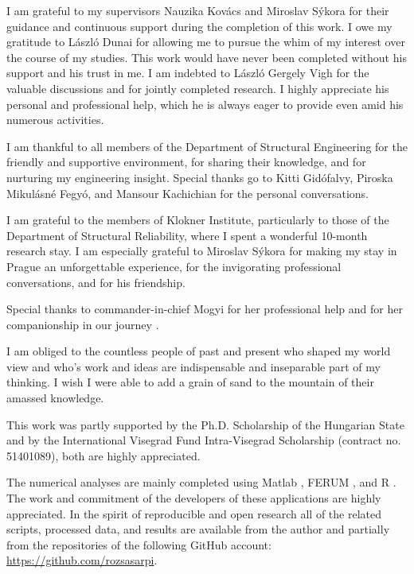 
\begin{acknowledgements}  

I am grateful to my supervisors Nauzika Kovács and Miroslav Sýkora for their guidance and continuous support during the completion of this work. I owe my gratitude to László Dunai for allowing me to pursue the whim of my interest over the course of my studies. This work would have never been completed without his support and his trust in me. I am indebted to László Gergely Vigh for the valuable discussions and for jointly completed research. I highly appreciate his personal and professional help, which he is always eager to provide even amid his numerous activities.

I am thankful to all members of the Department of Structural Engineering for the friendly and supportive environment, for sharing their knowledge, and for nurturing my engineering insight. Special thanks go to Kitti Gidófalvy, Piroska Mikulásné Fegyó, and Mansour Kachichian for the personal conversations.

I am grateful to the members of Klokner Institute, particularly to those of the Department of Structural Reliability, where I spent a wonderful 10-month research stay. I am especially grateful to Miroslav Sýkora for making my stay in Prague an unforgettable experience, for the invigorating professional conversations, and for his friendship. 

Special thanks to commander-in-chief Mogyi for her professional help and for her companionship in our journey {\tiny \PHcat}.

I am obliged to the countless people of past and present who shaped my world view and who's work and ideas are indispensable and inseparable part of my thinking. I wish I were able to add a grain of sand to the mountain of their amassed knowledge. 

This  work  was partly supported by the Ph.D. Scholarship of the Hungarian State and by the International  Visegrad  Fund  Intra-Visegrad Scholarship  (contract  no.  51401089), both are highly appreciated.

The numerical analyses are mainly completed using Matlab \citep{Matlab2015a}, FERUM \citep{Kiureghian2006}, and R \citep{R2015}. The work and commitment of the developers of these applications are highly appreciated. In the spirit of reproducible and open research all of the related scripts, processed data, and results are available from the author and partially from the repositories of the following GitHub account:\\
\url{https://github.com/rozsasarpi}.

\end{acknowledgements}
